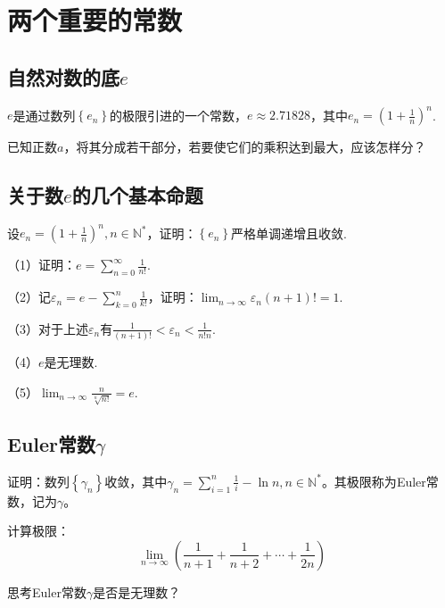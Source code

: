 \newpage
\section{两个重要的常数}
\label{sec:analysis-constants}

\subsection{自然对数的底\texorpdfstring{\(e\)}{e}}
\(e\)是通过数列\(\left\{ e_{n} \right\}\)的极限引进的一个常数，\(e \approx 2.71828\)，其中\(e_{n} = {\left( 1 + \frac{1}{n} \right)}^{n}\).

\begin{example}
已知正数\(a\)，将其分成若干部分，若要使它们的乘积达到最大，应该怎样分？
\end{example}

\subsection{关于数\texorpdfstring{\(e\)}{e}的几个基本命题}
设\(e_{n} = {\left( 1 + \frac{1}{n} \right)}^{n} , n \in \mathbb{N}^{*}\)，证明：\(\left\{ e_{n} \right\}\)严格单调递增且收敛.

（1）证明：\(e = \sum _{n = 0}^{\infty} \frac{1}{n !}\).

（2）记\(\varepsilon_{n} = e - \sum _{k = 0}^{n} \frac{1}{k !}\)，证明：\(\lim_{n \to \infty} \varepsilon_{n} \left( n + 1 \right) ! = 1\).

（3）对于上述\(\varepsilon_{n}\)有\(\frac{1}{\left( n + 1 \right) !} < \varepsilon_{n} < \frac{1}{n ! n}\).

（4）\(e\)是无理数.

（5）\(\lim_{n \to \infty} \frac{n}{\sqrt[n]{n !}} = e\).

\subsection{Euler常数\texorpdfstring{\(\gamma\)}{gamma}}
\label{subsec:analysis-euler-constant}
证明：数列\(\left\{ \gamma_{n} \right\}\)收敛，其中\(\gamma_{n} = \sum _{i = 1}^{n} \frac{1}{i} - \ln n , n \in \mathbb{N}^{*}\)。其极限称为{\heiti{}Euler常数}，记为\(\gamma\)。

计算极限：
\begin{equation}
    \lim_{n \to \infty} \left( \frac{1}{n + 1} + \frac{1}{n + 2} + \cdots + \frac{1}{2 n} \right)
\end{equation}

{\kaiti{}思考\quad Euler常数\(\gamma\)是否是无理数？}

